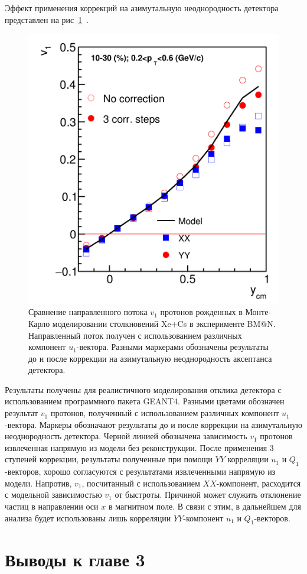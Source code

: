 Эффект применения коррекций на азимутальную неоднородность детектора представлен на рис~\ref{fig:bmn_components}~\cite{Mamaev:2023yhz}.
%
\begin{figure}[ht]
\begin{center}
\includegraphics[width=0.45\linewidth]{images/v1_proton_correction_rapidity.png}
\caption{Сравнение направленного потока $v_1$ протонов рожденных в Монте-Карло моделировании столкновений Xe+Cs в эксперименте BM@N. Направленный поток получен с использованием различных компонент $u_1$-вектора. Разными маркерами обозначены результаты до и после коррекции на азимутальную неоднородность аксептанса детектора. }
\label{fig:bmn_components}
\end{center}
\end{figure}

Результаты получены для реалистичного моделирования отклика детектора с использованием программного пакета GEANT4.
Разными цветами обозначен результат $v_1$ протонов, полученный с использованием различных компонент $u_1$-вектора. 
Маркеры обозначают результаты до и после коррекции на азимутальную неоднородность детектора.
Черной линией обозначена зависимость $v_1$ протонов извлеченная напрямую из модели без реконструкции.
После применения 3 ступеней коррекции, результаты полученные при помощи $YY$ корреляции $u_1$ и $Q_1$-векторов, хорошо согласуются с результатами извлеченными напрямую из модели.
Напротив, $v_1$, посчитанный с использованием $XX$-компонент, расходится с модельной зависимостью $v_1$ от быстроты. 
Причиной может служить отклонение частиц в направлении оси $x$ в магнитном поле. 
В связи с этим, в дальнейшем для анализа будет использованы лишь корреляции $YY$-компонент $u_1$ и $Q_1$-векторов.


\section{Выводы к главе 3}

